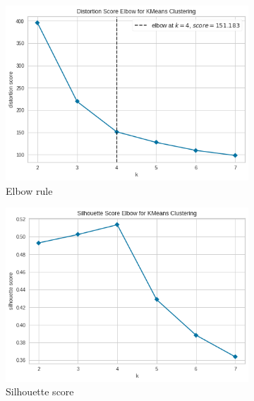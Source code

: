 \begin{figure}[h]
  \begin{subfigure}[b]{0.32\textwidth}
		\includegraphics[width=\textwidth]{plots/kmeans/kmeans_elbow_rule}
    \caption{Elbow rule}
		\label{fig:kmeans_elbow_rule}
  \end{subfigure}
  \hfill
  \begin{subfigure}[b]{0.32\textwidth}
		\includegraphics[width=\textwidth]{plots/kmeans/kmeans_silhouette_score}
		\caption{Silhouette score}
		\label{fig:kmeans_silhouette_score}
  \end{subfigure}
	\hfill
	\begin{subfigure}[b]{0.32\textwidth}

\end{subfigure}
\end{figure}
